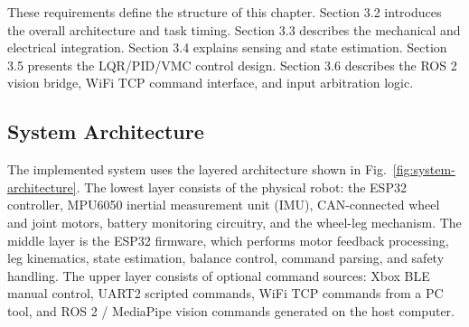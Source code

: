 \documentclass[12pt, a4paper]{article}
\begin{document}
These requirements define the structure of this chapter. Section 3.2 introduces the overall architecture and task timing. Section 3.3 describes the mechanical and electrical integration. Section 3.4 explains sensing and state estimation. Section 3.5 presents the LQR/PID/VMC control design. Section 3.6 describes the ROS 2 vision bridge, WiFi TCP command interface, and input arbitration logic.

\subsection{System Architecture}

The implemented system uses the layered architecture shown in Fig.~\ref{fig:system-architecture}. The lowest layer consists of the physical robot: the ESP32 controller, MPU6050 inertial measurement unit (IMU), CAN-connected wheel and joint motors, battery monitoring circuitry, and the wheel-leg mechanism. The middle layer is the ESP32 firmware, which performs motor feedback processing, leg kinematics, state estimation, balance control, command parsing, and safety handling. The upper layer consists of optional command sources: Xbox BLE manual control, UART2 scripted commands, WiFi TCP commands from a PC tool, and ROS 2 / MediaPipe vision commands generated on the host computer.
\end{document}
